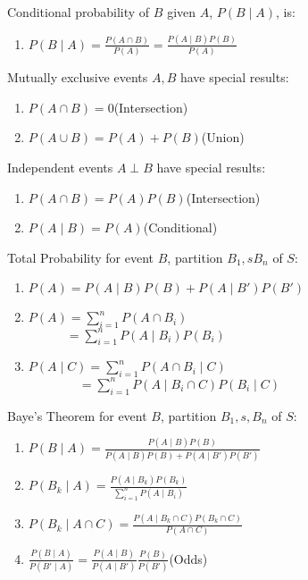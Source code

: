 \documentclass[12pt, a4paper]{article}
\begin{document}
\begin{multicols*}{3}
Conditional probability of $B$ given $A$, $P(B\mid A)$, is:
\begin{enumerate}[\roman*.]
  \item $P(B\mid A) = \displaystyle\frac{P(A\cap B)}{P(A)} = \frac{P(A\mid B) P(B)}{P(A)}$\hfill
\end{enumerate}

Mutually exclusive events $A,B$ have special results:
\begin{enumerate}[\roman*.]
  \item $P(A\cap B) = 0$\hfill(Intersection)
  \item $P(A\cup B) = P(A) + P(B)$\hfill(Union)
\end{enumerate}

Independent events $A \perp B$ have special results:
\begin{enumerate}[\roman*.]
  \item $P(A\cap B) = P(A) P(B)$\hfill(Intersection)
  \item $P(A\mid B) = P(A)$\hfill(Conditional)
\end{enumerate}

Total Probability for event $B$, partition $B_1, s B_n$ of $S$:
\begin{enumerate}[\roman*.]
  \item $P(A) = P(A \mid B) P(B) + P(A \mid B') P(B')$
  \item $P(A) = \displaystyle \sum^n_{i=1}P(A\cap B_i)$\\$\quad\quad\quad=\displaystyle \sum^n_{i=1} P(A\mid B_i) P(B_i)$
  \item $P(A\mid C) = \displaystyle \sum^n_{i=1} P(A\cap B_i\mid C)$\\$\quad\quad\quad\quad=\displaystyle  \sum^n_{i=1} P(A\mid B_i \cap C) P(B_i\mid C)$
\end{enumerate}

Baye's Theorem for event $B$, partition $B_1, s, B_n$ of $S$:
\begin{enumerate}[\roman*.]
  \item $P(B\mid A) = \displaystyle \frac{P(A\mid B) P(B)}{P(A\mid B) P(B) + P(A\mid B') P(B')}$
  \item $P(B_k\mid A) = \displaystyle \frac{P(A\mid B_k) P(B_k)}{\sum^n_{i=1} P(A\mid B_i)}$
  \item $P(B_k\mid A \cap C) = \displaystyle \frac{P(A\mid B_k \cap C) P(B_k \cap C)}{P(A\cap C)}$
  \item $\displaystyle \frac{P(B\mid A)}{P(B'\mid A)} = \frac{P(A\mid B)}{P(A\mid B')}  \frac{P(B)}{P(B')}$\hfill(Odds)
\end{enumerate}



\end{multicols*}
\end{document}

